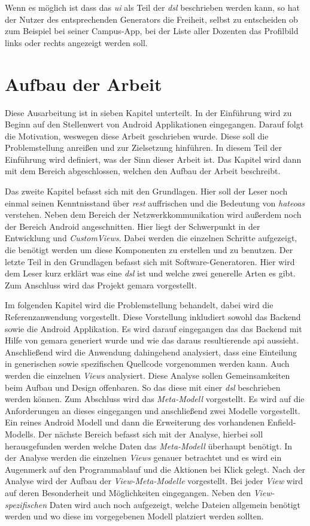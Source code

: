 Wenn es möglich ist dass das \textit{\ac{ui}} als Teil der \textit{\acf{dsl}} beschrieben werden kann, so hat der Nutzer des entsprechenden Generators die Freiheit, selbst zu entscheiden ob zum Beispiel bei seiner Campus-App, bei der Liste aller Dozenten das Profilbild links oder rechts angezeigt werden soll.

\section{Aufbau der Arbeit}\label{sec:structure}
Diese Ausarbeitung ist in sieben Kapitel unterteilt. In der Einführung wird zu Beginn auf den Stellenwert von Android Applikationen eingegangen. Darauf folgt die Motivation, weswegen diese Arbeit geschrieben wurde. Diese soll die Problemstellung anreißen und zur Zielsetzung hinführen. In diesem Teil der Einführung wird definiert, was der Sinn dieser Arbeit ist. Das Kapitel wird dann mit dem Bereich abgeschlossen, welchen den Aufbau der Arbeit beschreibt.

Das zweite Kapitel befasst sich mit den Grundlagen. Hier soll der Leser noch einmal seinen Kenntnisstand über \textit{\acf{rest}} auffrischen und die Bedeutung von \textit{\acf{hateoas}} verstehen. Neben dem Bereich der Netzwerkkommunikation wird außerdem noch der Bereich Android angeschnitten. Hier liegt der Schwerpunkt in der Entwicklung und \textit{CustomViews}. Dabei werden die einzelnen Schritte aufgezeigt, die benötigt werden um diese Komponenten zu erstellen und zu benutzen. Der letzte Teil in den Grundlagen befasst sich mit Software-Generatoren. Hier wird dem Leser kurz erklärt was eine \textit{\acf{dsl}} ist und welche zwei generelle Arten es gibt.
Zum Anschluss wird das Projekt \acf{gemara} vorgestellt. 

Im folgenden Kapitel wird die Problemstellung behandelt, dabei wird die Referenzanwendung vorgestellt. Diese Vorstellung inkludiert sowohl das Backend sowie die Android Applikation. Es wird darauf eingegangen das das Backend mit Hilfe von \ac{gemara} generiert wurde und wie das daraus resultierende \acl{api} aussieht. Anschließend wird die Anwendung dahingehend analysiert, dass eine Einteilung in generischen sowie spezifischen Quellcode vorgenommen werden kann. Auch werden die einzelnen \textit{Views} analysiert. Diese Analyse sollen Gemeinsamkeiten beim Aufbau und Design offenbaren. So das diese mit einer \textit{\ac{dsl}} beschrieben werden können. Zum Abschluss wird das \textit{Meta-Modell} vorgestellt. Es wird auf die Anforderungen an dieses eingegangen und anschließend zwei Modelle vorgestellt. Ein reines Android Modell und dann die Erweiterung des vorhandenen Enfield-Modells. Der nächste Bereich befasst sich mit der Analyse, hierbei soll herausgefunden werden welche Daten das \textit{Meta-Modell} überhaupt benötigt. In der Analyse werden die einzelnen \textit{Views} genauer betrachtet und es wird ein Augenmerk auf den Programmablauf und die Aktionen bei Klick gelegt. Nach der Analyse wird der Aufbau der \textit{View-Meta-Modelle} vorgestellt. Bei jeder \textit{View} wird auf deren Besonderheit und Möglichkeiten eingegangen. Neben den \textit{View-spezifischen} Daten wird auch noch aufgezeigt, welche Dateien allgemein benötigt werden und wo diese im vorgegebenen Modell platziert werden sollten. 

